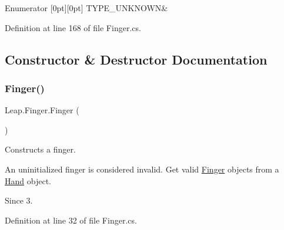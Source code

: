\begin{DoxyEnumFields}{Enumerator}
[0pt][0pt]{}\mbox{\label{class_leap_1_1_finger_ae75e8d46a01aff0bd5c6d6fb99e2f2baacc25e6802810879f48a8f1f6dff41a81}} 
T\+Y\+P\+E\+\_\+\+U\+N\+K\+N\+O\+WN&\\
\hline

\end{DoxyEnumFields}


Definition at line 168 of file Finger.\+cs.



\subsection{Constructor \& Destructor Documentation}
\mbox{\label{class_leap_1_1_finger_a8f4b7394c11cf9d7db50f0d7d1e3324d}} 
\subsubsection{\texorpdfstring{Finger()}{Finger()}\hspace{0.1cm}{\footnotesize\ttfamily [1/2]}}
{\footnotesize\ttfamily Leap.\+Finger.\+Finger (\begin{DoxyParamCaption}{ }\end{DoxyParamCaption})}



Constructs a finger. 

An uninitialized finger is considered invalid. Get valid \mbox{\hyperlink{class_leap_1_1_finger}{Finger}} objects from a \mbox{\hyperlink{class_leap_1_1_hand}{Hand}} object.

\begin{DoxySince}{Since}
3. 
\end{DoxySince}


Definition at line 32 of file Finger.\+cs.

\mbox{\label{class_leap_1_1_finger_aa8b049ce7229fdeb1de58a59c2d9298d}} 
